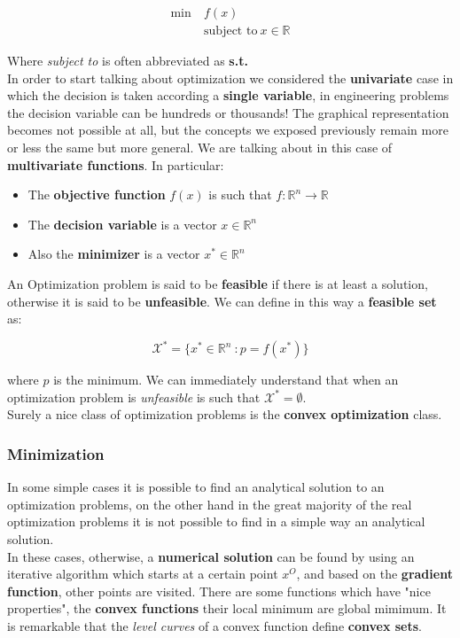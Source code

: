 {\large{
\begin{equation}
    \begin{aligned}
        \min \ &f(x)\\
        &\text{subject to} \ x\in \mathbb{R}
    \end{aligned}
\end{equation}

}}

Where \textit{subject to} is often abbreviated as \textbf{s.t.}\\
In order to start talking about optimization we considered the \textbf{univariate} case in which the decision is taken according a \textbf{single variable}, in engineering problems the decision variable can be hundreds or thousands! The graphical representation becomes not possible at all, but the concepts we exposed previously remain more or less the same but more general. We are talking about in this case of \textbf{multivariate functions}. In particular: 
\begin{itemize}
    \item The \textbf{objective function} $f(x)$ is such that $f:\mathbb{R}^n\to\mathbb{R}$
    \item The \textbf{decision variable} is a vector $x\in\mathbb{R}^n$
    \item Also the \textbf{minimizer} is a vector $x^*\in \mathbb{R}^n$
\end{itemize}
An Optimization problem is said to be \textbf{feasible} if there is at least a solution, otherwise it is said to be \textbf{unfeasible}. We can define in this way a \textbf{feasible set} as:
{\large{

\begin{equation}
    \mathcal{X}^*=\{x^* \in \mathbb{R}^n \ : p=f(x^*) \}
\end{equation}
}}

where $p$ is the minimum. We can immediately understand that when an optimization problem is \textit{unfeasible} is such that $\mathcal{X}^*=\emptyset$. \\
Surely a nice class of optimization problems is the \textbf{convex optimization} class.

{\color{blue} \subsubsection{Minimization}}
\noindent
In some simple cases it is possible to find an analytical solution to an optimization problems, on the other hand in the great majority of the real optimization problems it is not possible to find in a simple way an analytical solution.\\
In these cases, otherwise, a \textbf{numerical solution} can be found by using an iterative algorithm which starts at a certain point $x^O$, and based on the \textbf{gradient function}, other points are visited. There are some functions which have "nice properties", the \textbf{convex functions} their local minimum are global mimimum. It is remarkable that the \textit{level curves} of a convex function define \textbf{convex sets}.\\

